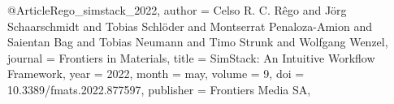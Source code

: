 @Article{Rego_simstack_2022,
  author    = {Celso R. C. R{\^{e}}go and Jörg Schaarschmidt and Tobias Schlöder and Montserrat Penaloza-Amion and Saientan Bag and Tobias Neumann and Timo Strunk and Wolfgang Wenzel},
  journal   = {Frontiers in Materials},
  title     = {{SimStack}: An Intuitive Workflow Framework},
  year      = {2022},
  month     = {may},
  volume    = {9},
  doi       = {10.3389/fmats.2022.877597},
  publisher = {Frontiers Media {SA}},
}
